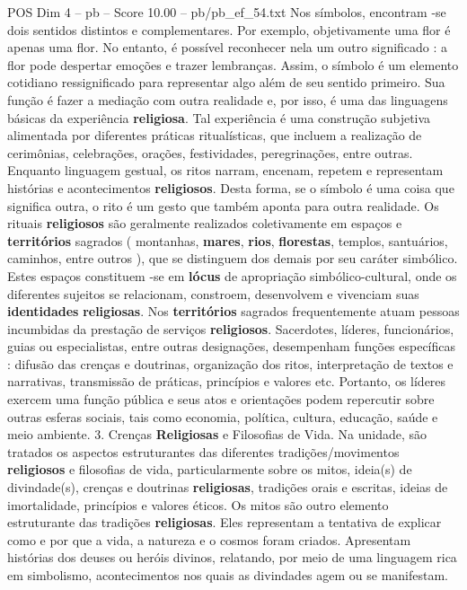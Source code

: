 \begin{textsample}{POS Dim 4 – pb – Score 10.00 – pb/pb\_ef\_54.txt}
Nos símbolos, encontram -se dois sentidos distintos e complementares.
Por exemplo, objetivamente uma flor é apenas uma flor.
No entanto, é possível reconhecer nela um outro significado : a flor pode despertar emoções e trazer lembranças.
Assim, o símbolo é um elemento cotidiano ressignificado para representar algo além de seu sentido primeiro.
Sua função é fazer a mediação com outra realidade e, por isso, é uma das linguagens básicas da experiência \textbf{religiosa}.
Tal experiência é uma construção subjetiva alimentada por diferentes práticas ritualísticas, que incluem a realização de cerimônias, celebrações, orações, festividades, peregrinações, entre outras.
Enquanto linguagem gestual, os ritos narram, encenam, repetem e representam histórias e acontecimentos \textbf{religiosos}.
Desta forma, se o símbolo é uma coisa que significa outra, o rito é um gesto que também aponta para outra realidade.
Os rituais \textbf{religiosos} são geralmente realizados coletivamente em espaços e \textbf{territórios} sagrados ( montanhas, \textbf{mares}, \textbf{rios}, \textbf{florestas}, templos, santuários, caminhos, entre outros ), que se distinguem dos demais por seu caráter simbólico.
Estes espaços constituem -se em \textbf{lócus} de apropriação simbólico-cultural, onde os diferentes sujeitos se relacionam, constroem, desenvolvem e vivenciam suas \textbf{identidades} \textbf{religiosas}.
Nos \textbf{territórios} sagrados frequentemente atuam pessoas incumbidas da prestação de serviços \textbf{religiosos}.
Sacerdotes, líderes, funcionários, guias ou especialistas, entre outras designações, desempenham funções específicas : difusão das crenças e doutrinas, organização dos ritos, interpretação de textos e narrativas, transmissão de práticas, princípios e valores etc.
Portanto, os líderes exercem uma função pública e seus atos e orientações podem repercutir sobre outras esferas sociais, tais como economia, política, cultura, educação, saúde e meio ambiente. 3.
Crenças \textbf{Religiosas} e Filosofias de Vida.
Na unidade, são tratados os aspectos estruturantes das diferentes tradições/movimentos \textbf{religiosos} e filosofias de vida, particularmente sobre os mitos, ideia(s) de divindade(s), crenças e doutrinas \textbf{religiosas}, tradições orais e escritas, ideias de imortalidade, princípios e valores éticos.
Os mitos são outro elemento estruturante das tradições \textbf{religiosas}.
Eles representam a tentativa de explicar como e por que a vida, a natureza e o cosmos foram criados.
Apresentam histórias dos deuses ou heróis divinos, relatando, por meio de uma linguagem rica em simbolismo, acontecimentos nos quais as divindades agem ou se manifestam.

\end{textsample}
